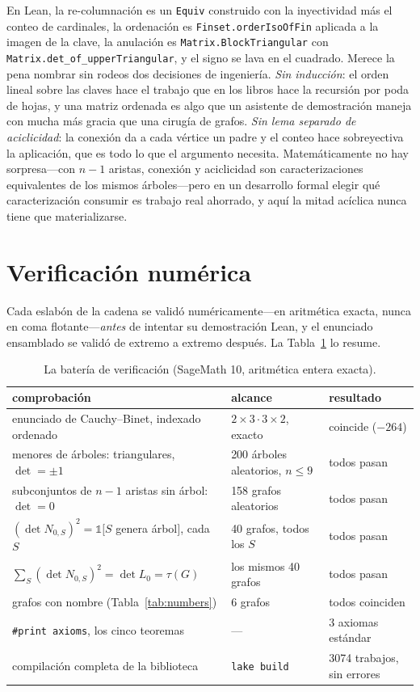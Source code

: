 \documentclass[11pt]{article}
\newcommand{\lean}[1]{\texttt{#1}}
\begin{document}
En Lean, la re-columnaci\'on es un \lean{Equiv} construido con la inyectividad m\'as el conteo
de cardinales, la ordenaci\'on es \lean{Finset.orderIsoOfFin} aplicada a la imagen de la clave,
la anulaci\'on es \lean{Matrix.BlockTriangular} con \lean{Matrix.det\_of\_upperTriangular}, y
el signo se lava en el cuadrado. Merece la pena nombrar sin rodeos dos decisiones de
ingenier\'ia. \emph{Sin inducci\'on}: el orden lineal sobre las claves hace el trabajo que en
los libros hace la recursi\'on por poda de hojas, y una matriz ordenada es algo que un
asistente de demostraci\'on maneja con mucha m\'as gracia que una cirug\'ia de grafos.
\emph{Sin lema separado de aciclicidad}: la conexi\'on da a cada v\'ertice un padre y el
conteo hace sobreyectiva la aplicaci\'on, que es todo lo que el argumento necesita.
Matem\'aticamente no hay sorpresa---con $n-1$ aristas, conexi\'on y aciclicidad son
caracterizaciones equivalentes de los mismos \'arboles---pero en un desarrollo formal elegir
qu\'e caracterizaci\'on consumir es trabajo real ahorrado, y aqu\'i la mitad ac\'iclica nunca
tiene que materializarse.

\section{Verificaci\'on num\'erica}
\label{sec:verification}

Cada eslab\'on de la cadena se valid\'o num\'ericamente---en aritm\'etica exacta, nunca en coma
flotante---\emph{antes} de intentar su demostraci\'on Lean, y el enunciado ensamblado se
valid\'o de extremo a extremo despu\'es. La Tabla~\ref{tab:verification} lo resume.

\begin{table}[h]
\centering\footnotesize
{}
\begin{tabular}{lll}
\toprule
\rowcolor{ggteal!18} comprobaci\'on & alcance & resultado \\
\midrule
enunciado de Cauchy--Binet, indexado ordenado & $2\times3\cdot3\times2$, exacto & coincide ($-264$) \\
menores de \'arboles: triangulares, $\det=\pm1$ & 200 \'arboles aleatorios, $n\le9$ & todos pasan \\
subconjuntos de $n{-}1$ aristas sin \'arbol: $\det=0$ & 158 grafos aleatorios & todos pasan \\
$(\det N_{0,S})^2=\mathbb 1[S$ genera \'arbol$]$, cada $S$ & 40 grafos, todos los $S$ & todos pasan \\
$\sum_S(\det N_{0,S})^2=\det L_0=\tau(G)$ & los mismos 40 grafos & todos pasan \\
grafos con nombre (Tabla~\ref{tab:numbers}) & 6 grafos & todos coinciden \\
\lean{\#print axioms}, los cinco teoremas & --- & 3 axiomas est\'andar \\
compilaci\'on completa de la biblioteca & \lean{lake build} & 3074 trabajos, sin errores \\
\bottomrule
\end{tabular}
\caption{La bater\'ia de verificaci\'on (SageMath 10, aritm\'etica entera exacta).}
\label{tab:verification}
\end{table}
\end{document}
